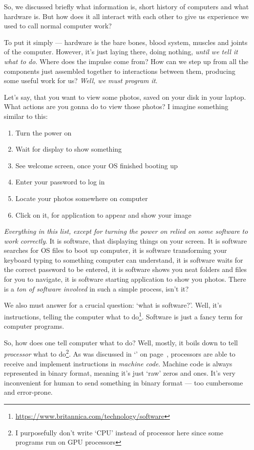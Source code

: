 \documentclass[../../why-computer.tex]{subfiles}
\begin{document}
    So, we discussed briefly what information is, short history of computers and what hardware is. But how does it all interact with each other to give us experience
    we used to call normal computer work? \par

    To put it simply --- hardware is the bare bones, blood system, muscles and joints of the computer. However, it's just laying there, doing nothing, \emph{until we tell it 
    what to do}. Where does the impulse come from? How can we step up from all the components just assembled together to interactions between them, producing some
    useful work for us? \emph{Well, we must program it}. \par

    Let's say, that you want to view some photos, saved on your disk in your laptop. What actions are you gonna do to view those photos? I imagine something similar to
    this: 

    \begin{enumerate}
        \item Turn the power on
        \item Wait for display to show something
        \item See welcome screen, once your OS finished booting up
        \item Enter your password to log in
        \item Locate your photos somewhere on computer
        \item Click on it, for application to appear and show your image
    \end{enumerate}

    \emph{Everything in this list, except for turning the power on relied on some software to work correctly}. It is software, that displaying things on your screen.
    It is software searches for OS files to boot up computer, it is software transforming your keyboard typing to something computer can understand, it is software
    waits for the correct password to be entered, it is software shows you neat folders and files for you to navigate, it is software starting application to show you
    photos. There is a \emph{ton of software involved} in such a simple process, isn't it? \par

    We also must answer for a crucial question: `what is software?'. Well, it's instructions, telling the computer what to do\footnote{\href{https://www.britannica.com/technology/software}
    {https://www.britannica.com/technology/software}}. Software is just a fancy term for computer programs. \par

    So, how does one tell computer what to do? Well, mostly, it boils down to tell \emph{processor} what to do\footnote{I purposefully don't write `CPU' instead of processor 
    here since some programs run on GPU processors}. As was discussed in `' on page~\pageref{section:modern-computers}, processors are able 
    to receive and implement instructions in \emph{machine code}. Machine code is always represented in binary format, meaning it's just `raw' zeros and ones. It's very
    inconvenient for human to send something in binary format --- too cumbersome and error-prone. 
    
\end{document}
